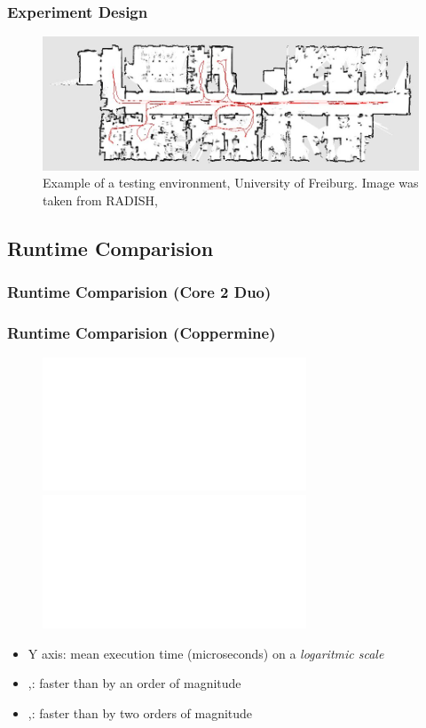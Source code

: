 

\begin{frame}
\frametitle{Experiment Design}
\transfade%
	\begin{figure}
	 \centering
	 \includegraphics[width=1.05\columnwidth,keepaspectratio]{images/freiburg.JPG}
	 \caption{Example of a testing environment, University of Freiburg.  Image
	 was taken from RADISH, \cite{Radish}}
	\end{figure}
\end{frame}

\subsection*{Runtime Comparision}
\begin{frame}
\frametitle<1>{Runtime Comparision (Core 2 Duo)}
\frametitle<2>{Runtime Comparision (Coppermine)}
\transfade%
{}
	\vspace{-10pt}
	\begin{figure}
	 \centering
	 \includegraphics<1>[width=0.7\textwidth,keepaspectratio,angle=0]{../Thesis/graphs/plot_Results_five_algorithms.pdf}
	 \includegraphics<2>[width=0.7\textwidth,keepaspectratio,angle=0]{../Thesis/graphs/plot_Results_coppermine.pdf}
	\end{figure}
	\vspace{-10pt}
	\begin{itemize} 
  \item Y axis: mean execution time (microseconds) on a \emph{logaritmic scale} 
  \item \WFD,\WFDINC: faster than \SOTA by an order of magnitude 
  \item \FFD,\WFDIP: faster than \SOTA by two orders of magnitude 
\end{itemize}
\end{frame}

